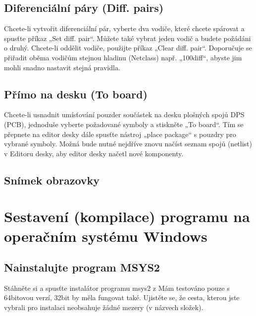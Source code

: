 \documentclass[letterpaper,10pt,czech]{sphinxmanual}
\begin{document}
\section{Diferenciální páry (Diff. pairs)}
\label{\detokenize{imp-sch:diferencialni-pary-diff-pairs}}\label{\detokenize{imp-sch:diferencialni-pary}}
Chcete-li vytvořit diferenciální pár, vyberte dva vodiče, které chcete spárovat a spusťte příkaz „Set diff. pair“. Můžete také vybrat jeden vodič a budete požádáni o druhý. Chcete-li oddělit vodiče, použijte příkaz „Clear diff. pair“. Doporučuje se přiřadit oběma vodičům stejnou hladinu (Netclass) např. „100diff“, abyste jim mohli snadno nastavit stejná pravidla.


\section{Přímo na desku (To board)}
\label{\detokenize{imp-sch:primo-na-desku-to-board}}
Chcete-li usnadnit umísťování pouzder součástek na desku plošných spojů DPS (PCB), jednoduše vyberte
požadované symboly a stiskněte „To board“. Tím se přepnete na editor desky dále spusťte nástroj „place package“ s pouzdry pro vybrané symboly. Možná bude nutné nejdříve znovu načíst seznam spojů (netlist) v Editoru desky, aby editor desky načetl nové komponenty.


\section{Snímek obrazovky}
\label{\detokenize{imp-sch:snimek-obrazovky}}
\begin{figure}[htbp]
\centering

\noindent{}
\end{figure}


\chapter{Sestavení (kompilace) programu na operačním systému Windows}
\label{\detokenize{build-win32:sestaveni-kompilace-programu-na-operacnim-systemu-windows}}\label{\detokenize{build-win32::doc}}

\section{Nainstalujte program MSYS2}
\label{\detokenize{build-win32:nainstalujte-program-msys2}}
Stáhněte si a spusťte instalátor programu msys2 z  Mám
testováno pouze s 64bitovou verzí, 32bit by měla fungovat také. Ujistěte se, že cesta, kterou jste vybrali pro instalaci neobsahuje žádné mezery (v názvech složek).
\end{document}
